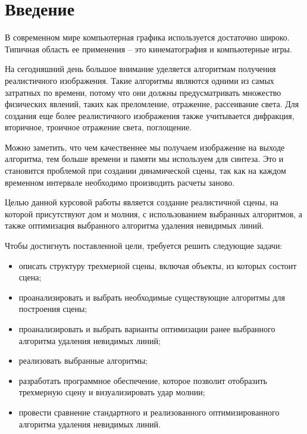 \chapter*{Введение}

В современном мире компьютерная графика используется достаточно широко. Типичная область ее применения – это кинематография и компьютерные игры.

На сегодняшний день большое внимание уделяется алгоритмам получения реалистичного изображения. Такие алгоритмы являются одними из самых затратных по времени, потому что они должны предусматривать множество физических явлений, таких как преломление, отражение, рассеивание света. Для создания еще более реалистичного изображения также учитывается дифракция, вторичное, троичное отражение света, поглощение. 

Можно заметить, что чем качественнее мы получаем изображение на выходе алгоритма, тем больше времени и памяти мы используем для синтеза. Это и становится проблемой при создании динамической сцены, так как на каждом временном интервале необходимо производить расчеты заново. 

Целью данной курсовой работы является создание реалистичной сцены, на которой присутствуют дом и молния, с использованием выбранных алгоритмов, а также оптимизация выбранного алгоритма удаления невидимых линий.

Чтобы достигнуть поставленной цели, требуется решить следующие задачи:

\begin{itemize}
	\item описать структуру трехмерной сцены, включая объекты, из которых состоит сцена;
    \item проанализировать и выбрать необходимые существующие алгоритмы для построения сцены;
    \item проанализировать и выбрать варианты оптимизации ранее выбранного алгоритма удаления невидимых линий;
    \item реализовать выбранные алгоритмы;
    \item разработать программное обеспечение, которое позволит отобразить трехмерную сцену и визуализировать удар молнии;
    \item провести сравнение стандартного и реализованного оптимизированного алгоритма удаления невидимых линий.
\end{itemize}
